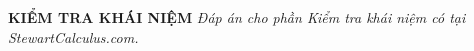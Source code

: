 \documentclass[10pt,letterpaper]{article}
\begin{document}
\vspace{7pt}

\noindent
{\fontsize{10}{12}\selectfont\textbf{\textsf{\color{stewartcyan}KIỂM TRA KHÁI NIỆM}}}%
\hfill
{\footnotesize\textit{Đáp án cho phần Kiểm tra khái niệm có tại StewartCalculus.com.}}
\par\vspace{2pt}
\noindent{\color{stewartcyan}\rule{\textwidth}{0.8pt}}

\vspace{7pt}

\noindent
\end{document}
